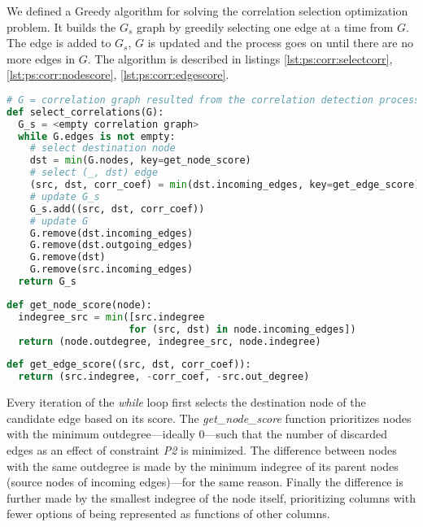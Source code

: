 We defined a Greedy algorithm for solving the correlation selection optimization problem. It builds the \(G_{s}\) graph by greedily selecting one edge at a time from \(G\). The edge is added to \(G_{s}\), \(G\) is updated and the process goes on until there are no more edges in \(G\). The algorithm is described in listings \ref{lst:ps:corr:selectcorr}, \ref{lst:ps:corr:nodescore}, \ref{lst:ps:corr:edgescore}.

\begin{lstlisting}[language=Python,
label={lst:ps:corr:selectcorr},
caption={select\_correlations}]
# G = correlation graph resulted from the correlation detection process
def select_correlations(G):
  G_s = <empty correlation graph>
  while G.edges is not empty:
    # select destination node
    dst = min(G.nodes, key=get_node_score)
    # select (_, dst) edge
    (src, dst, corr_coef) = min(dst.incoming_edges, key=get_edge_score)
    # update G_s
    G_s.add((src, dst, corr_coef))
    # update G
    G.remove(dst.incoming_edges)
    G.remove(dst.outgoing_edges)
    G.remove(dst)
    G.remove(src.incoming_edges)
  return G_s
\end{lstlisting}

\begin{lstlisting}[language=Python,
label={lst:ps:corr:nodescore},
caption={get\_node\_score}]
def get_node_score(node):
  indegree_src = min([src.indegree 
                     for (src, dst) in node.incoming_edges])
  return (node.outdegree, indegree_src, node.indegree)
\end{lstlisting}

\begin{lstlisting}[language=Python,
label={lst:ps:corr:edgescore},
caption={get\_edge\_score}]
def get_edge_score((src, dst, corr_coef)):
  return (src.indegree, -corr_coef, -src.out_degree)
\end{lstlisting}
\bigskip

Every iteration of the \textit{while} loop first selects the destination node of the candidate edge based on its score. The \textit{get\_node\_score} function prioritizes nodes with the minimum outdegree---ideally 0---such that the number of discarded edges as an effect of constraint \textit{P2} is minimized. The difference between nodes with the same outdegree is made by the minimum indegree of its parent nodes (source nodes of incoming edges)---for the same reason. Finally the difference is further made by the smallest indegree of the node itself, prioritizing columns with fewer options of being represented as functions of other columns. 


